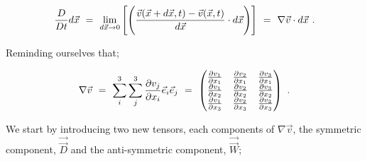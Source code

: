 \documentclass{article}
\newcounter{subsubsubsection}[subsubsection]
\begin{document}
\begin{equation} \label{eq:1}
\frac{D}{D t} d \vec{x} \hspace{0.125cm} = \hspace{0.125cm} \lim_{d \vec{x} \rightarrow 0} \Bigg[ \Bigg( \frac{\vec{v}(\vec{x} + d \vec{x}, t) - \vec{v}(\vec{x}, t)}{d \vec{x}} \cdot d \vec{x} \Bigg) \Bigg] \hspace{0.125cm} = \hspace{0.125cm} \nabla{\vec{v}} \cdot d \vec{x} \hspace{0.125cm} . 
\end{equation} 

Reminding ourselves that;

\begin{equation} \label{eq:1}
\nabla{\vec{v}} \hspace{0.125cm} = \hspace{0.125cm} \sum_{i}^{3} \sum_{j}^{3} \frac{\partial{v_j}}{\partial{x_i}} \vec{e}_i \vec{e}_j  \hspace{0.125cm} =  \hspace{0.125cm}  \begin{pmatrix} \frac{\partial{v_1}}{\partial{x_1}} & \frac{\partial{v_2}}{\partial{x_1}} & \frac{\partial{v_3}}{\partial{x_1}} \\ \frac{\partial{v_1}}{\partial{x_2}} & \frac{\partial{v_2}}{\partial{x_2}} & \frac{\partial{v_3}}{\partial{x_2}} \\ \frac{\partial{v_1}}{\partial{x_3}} & \frac{\partial{v_2}}{\partial{x_3}} & \frac{\partial{v_3}}{\partial{x_3}} \end{pmatrix} \hspace{0.125cm} . 
\end{equation} 





We start by introducing two new tensors, each components of \begin{math} \nabla{\vec{v}} \end{math}, the symmetric component, \begin{math} \vec{\vec{D}} \end{math} and the anti-symmetric component, \begin{math} \vec{\vec{W}} \end{math};
\end{document}
